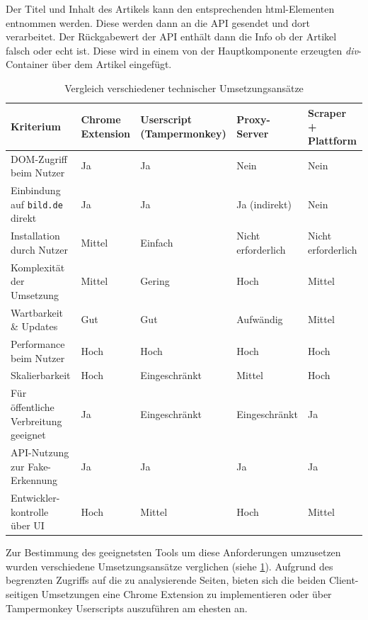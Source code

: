 Der Titel und Inhalt des Artikels kann den entsprechenden html-Elementen entnommen werden.
Diese werden dann an die API gesendet und dort verarbeitet. 
Der Rückgabewert der API enthält dann die Info ob der Artikel falsch oder echt ist.
Diese wird in einem von der Hauptkomponente erzeugten \textit{div}-Container über dem Artikel eingefügt.

\begin{table}[ht]
    \centering
    \renewcommand{\arraystretch}{1.3}
    \begin{tabular}{|p{2.5cm}|p{2.5cm}|p{2.5cm}|p{2.5cm}|p{2.5cm}|}
        \hline
        \textbf{Kriterium} & \textbf{Chrome Extension} & \textbf{Userscript (Tampermonkey)} & \textbf{Proxy-Server} & \textbf{Scraper + Plattform} \\
        \hline
        DOM-Zugriff beim Nutzer & Ja & Ja & Nein & Nein \\
        \hline
        Einbindung auf \texttt{bild.de} direkt & Ja & Ja & Ja (indirekt) & Nein \\
        \hline
        Installation durch Nutzer & Mittel & Einfach & Nicht erforderlich & Nicht erforderlich\\
        \hline
        Komplexität der Umsetzung & Mittel & Gering & Hoch & Mittel \\
        \hline
        Wartbarkeit \& Updates & Gut & Gut & Aufwändig & Mittel \\
        \hline
        Performance beim Nutzer & Hoch & Hoch & Hoch & Hoch \\
        \hline
        Skalierbarkeit & Hoch & Eingeschränkt & Mittel & Hoch \\
        \hline
        Für öffentliche Verbreitung geeignet & Ja & Eingeschränkt & Eingeschränkt & Ja \\
        \hline
        API-Nutzung zur Fake-Erkennung & Ja & Ja & Ja & Ja \\
        \hline
        Entwickler-kontrolle über UI & Hoch & Mittel & Hoch & Mittel \\
        \hline
    \end{tabular}
    \caption{Vergleich verschiedener technischer Umsetzungsansätze}
    \label{table:technischeAnsaetze}
\end{table}

Zur Bestimmung des geeignetsten Tools um diese Anforderungen umzusetzen wurden verschiedene Umsetzungsansätze verglichen (siehe \ref{table:technischeAnsaetze}).
Aufgrund des begrenzten Zugriffs auf die zu analysierende Seiten, bieten sich die beiden Client-seitigen Umsetzungen 
eine Chrome Extension zu implementieren oder über Tampermonkey Userscripts auszuführen am ehesten an.


